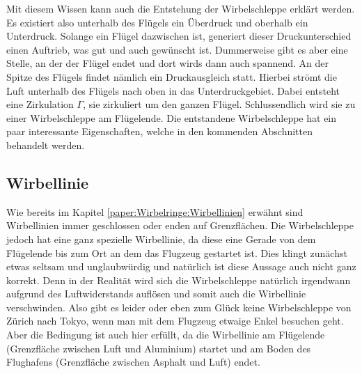 Mit diesem Wissen kann auch die Entstehung der Wirbelschleppe erklärt werden. 
Es existiert also unterhalb des Flügels ein Überdruck und oberhalb ein Unterdruck.
Solange ein Flügel dazwischen ist, generiert dieser Druckunterschied einen Auftrieb, was gut und auch gewünscht ist.
Dummerweise gibt es aber eine Stelle, an der der Flügel endet und dort wirds dann auch spannend.
An der Spitze des Flügels findet nämlich ein Druckausgleich statt.
Hierbei strömt die Luft unterhalb des Flügels nach oben in das Unterdruckgebiet. 
Dabei entsteht eine Zirkulation $\Gamma$, sie zirkuliert um den ganzen Flügel.
Schlussendlich wird sie zu einer Wirbelschleppe am Flügelende.
Die entstandene Wirbelschleppe hat ein paar interessante Eigenschaften, welche in den kommenden Abschnitten behandelt werden.

\subsection{Wirbellinie}
Wie bereits im Kapitel \ref{paper:Wirbelringe:Wirbellinien} erwähnt sind Wirbellinien immer geschlossen oder enden auf Grenzflächen.
Die Wirbelschleppe jedoch hat eine ganz spezielle Wirbellinie, da diese eine Gerade von dem Flügelende bis zum Ort an dem das Flugzeug gestartet ist.
Dies klingt zunächst etwas seltsam und unglaubwürdig und natürlich ist diese Aussage auch nicht ganz korrekt.
Denn in der Realität wird sich die Wirbelschleppe natürlich irgendwann aufgrund des Luftwiderstands auflösen und somit auch die Wirbellinie verschwinden.
Also gibt es leider oder eben zum Glück keine Wirbelschleppe von Zürich nach Tokyo, wenn man mit dem Flugzeug etwaige Enkel besuchen geht.
Aber die Bedingung ist auch hier erfüllt, da die Wirbellinie am Flügelende (Grenzfläche zwischen Luft und Aluminium) startet und am Boden des Flughafens (Grenzfläche zwischen Asphalt und Luft) endet.

